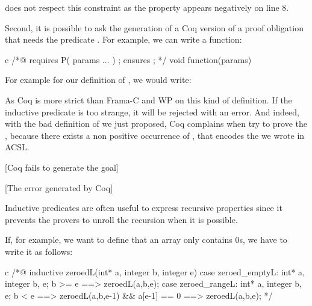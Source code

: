 
does not respect this constraint as the property 
appears negatively on line 8.

Second, it is possible to ask the generation of a Coq version of a proof
obligation that needs the predicate . For example, we can
write a function:



\begin{CodeBlock}{c}
/*@
  requires P( params ... ) ;
  ensures  \false ;
*/ void function(params){

}
\end{CodeBlock}



For example for our definition of , we would write:






As Coq is more strict than Frama-C and WP on this kind of definition. If the
inductive predicate is too strange, it will be rejected with an error. And
indeed, with the bad definition of  we just proposed,
Coq complains when try to prove the , because there
exists a non positive occurrence of , that encodes
the  we wrote in ACSL.



[Coq fails to generate the goal]

[The error generated by Coq]




Inductive predicates are often useful to express recursive properties since it
prevents the provers to unroll the recursion when it is possible.

If, for example, we want to define that an array only contains 0s, we have to
write it as follows:

\begin{CodeBlock}{c}
/*@
  inductive zeroed{L}(int* a, integer b, integer e){
  case zeroed_empty{L}:
    \forall int* a, integer b, e; b >= e ==> zeroed{L}(a,b,e);
  case zeroed_range{L}:
    \forall int* a, integer b, e; b < e ==>
      zeroed{L}(a,b,e-1) && a[e-1] == 0 ==> zeroed{L}(a,b,e);
  }
*/
\end{CodeBlock}

